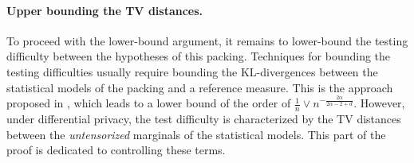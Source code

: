 \documentclass{article}
\theoremstyle{plain}
\theoremstyle{definition}
\theoremstyle{remark}
\begin{document}
    \paragraph{Upper bounding the TV distances.}

    To proceed with the lower-bound argument, it remains to lower-bound the testing difficulty between the hypotheses of this packing. Techniques for bounding the testing difficulties usually require bounding the KL-divergences between the statistical models of the packing and a reference measure. 
    This is the approach proposed in \cite{hutter2021minimax}, which leads to a lower bound of the order of $\frac{1}{n} \vee n^{- \frac{2 \alpha}{2 \alpha - 2 + d}}$. 
    However, under differential privacy, the test difficulty is characterized by the TV distances between the \emph{untensorized} marginals of the statistical models. 
    This part of the proof is dedicated to controlling these terms.

    
\end{document}
